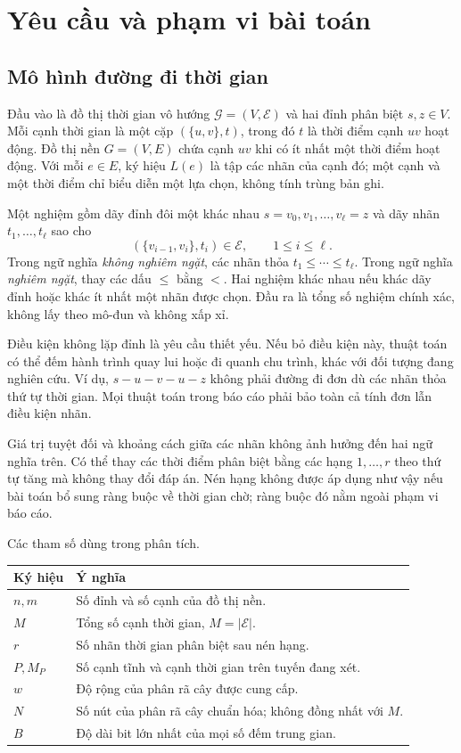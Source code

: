 \chapter{Yêu cầu và phạm vi bài toán}

\section{Mô hình đường đi thời gian}

Đầu vào là đồ thị thời gian vô hướng $\mathcal{G}=(V,\mathcal{E})$ và hai đỉnh phân biệt $s,z\in V$. Mỗi cạnh thời gian là một cặp $(\{u,v\},t)$, trong đó $t$ là thời điểm cạnh $uv$ hoạt động. Đồ thị nền $G=(V,E)$ chứa cạnh $uv$ khi có ít nhất một thời điểm hoạt động. Với mỗi $e\in E$, ký hiệu $L(e)$ là tập các nhãn của cạnh đó; một cạnh và một thời điểm chỉ biểu diễn một lựa chọn, không tính trùng bản ghi.

Một nghiệm gồm dãy đỉnh đôi một khác nhau $s=v_0,v_1,\ldots,v_\ell=z$ và dãy nhãn $t_1,\ldots,t_\ell$ sao cho
\[
  (\{v_{i-1},v_i\},t_i)\in\mathcal{E},\qquad 1\le i\le\ell.
\]
Trong ngữ nghĩa \emph{không nghiêm ngặt}, các nhãn thỏa $t_1\le\cdots\le t_\ell$. Trong ngữ nghĩa \emph{nghiêm ngặt}, thay các dấu $\le$ bằng $<$. Hai nghiệm khác nhau nếu khác dãy đỉnh hoặc khác ít nhất một nhãn được chọn. Đầu ra là tổng số nghiệm chính xác, không lấy theo mô-đun và không xấp xỉ.

Điều kiện không lặp đỉnh là yêu cầu thiết yếu. Nếu bỏ điều kiện này, thuật toán có thể đếm hành trình quay lui hoặc đi quanh chu trình, khác với đối tượng đang nghiên cứu. Ví dụ, $s-u-v-u-z$ không phải đường đi đơn dù các nhãn thỏa thứ tự thời gian. Mọi thuật toán trong báo cáo phải bảo toàn cả tính đơn lẫn điều kiện nhãn.

Giá trị tuyệt đối và khoảng cách giữa các nhãn không ảnh hưởng đến hai ngữ nghĩa trên. Có thể thay các thời điểm phân biệt bằng các hạng $1,\ldots,r$ theo thứ tự tăng mà không thay đổi đáp án. Nén hạng không được áp dụng như vậy nếu bài toán bổ sung ràng buộc về thời gian chờ; ràng buộc đó nằm ngoài phạm vi báo cáo.

\begin{table}[htbp]{Các tham số dùng trong phân tích.}
\label{tab:parameters}
\centering\small\renewcommand{\arraystretch}{1.1}
\begin{tabularx}{\linewidth}{lX}
\toprule
Ký hiệu & Ý nghĩa \\
\midrule
$n,m$ & Số đỉnh và số cạnh của đồ thị nền. \\
$M$ & Tổng số cạnh thời gian, $M=|\mathcal{E}|$. \\
$r$ & Số nhãn thời gian phân biệt sau nén hạng. \\
$P,M_P$ & Số cạnh tĩnh và cạnh thời gian trên tuyến đang xét. \\
$w$ & Độ rộng của phân rã cây được cung cấp. \\
$N$ & Số nút của phân rã cây chuẩn hóa; không đồng nhất với $M$. \\
$B$ & Độ dài bit lớn nhất của mọi số đếm trung gian. \\
\bottomrule
\end{tabularx}
\end{table}

